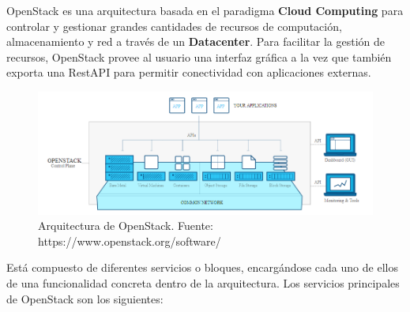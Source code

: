 OpenStack es una arquitectura basada en el paradigma \textbf{Cloud Computing} para controlar y gestionar grandes cantidades de recursos de computación, almacenamiento y red a través de un \textbf{Datacenter}. Para facilitar la gestión de recursos, OpenStack provee al usuario una interfaz gráfica a la vez que también exporta una RestAPI para permitir conectividad con aplicaciones externas.

\begin{figure}[!ht]
	\centering
	\includegraphics[width=0.9\linewidth]{imagenes/openstack_arch}
	\caption{Arquitectura de OpenStack. Fuente: https://www.openstack.org/software/}
	\label{fig:openstackarch}
\end{figure}

Está compuesto de diferentes servicios o bloques, encargándose cada uno de ellos de una funcionalidad concreta dentro de la arquitectura. Los servicios principales de OpenStack son los siguientes:

